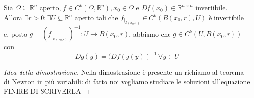 \documentclass[openany, italian]{book}
\begin{document}
\begin{theorem}
Sia $\Omega \subseteq \mathbb{R}^n$ aperto, $f \in C^k(\Omega, \mathbb{R}^n), x_0 \in \Omega$ e $Df(x_0) \in \mathbb{R}^{n \times n}$ invertibile. \\
Allora $\exists r > 0: \exists U \subseteq \mathbb{R}^n$ aperto tali che $f_{|_{B(x_0, r)}} \in C^{k}(B(x_0, r), U)$ è invertibile e, posto $g=(f_{|_{B(x_0, r)}})^{-1}:U \to B(x_0, r)$, abbiamo che
$g \in C^k(U, B(x_0, r))$ con
$$
Dg(y) = (Df(g(y))^{-1} \, \forall y \in U
$$
\begin{proof}[Idea della dimostrazione]
Nella dimostrazione è presente un richiamo al teorema di Newton in più variabili: di fatto noi vogliamo studiare le soluzioni all'equazione \\
FINIRE DI SCRIVERLA
\end{proof}

\end{theorem}
\end{document}
